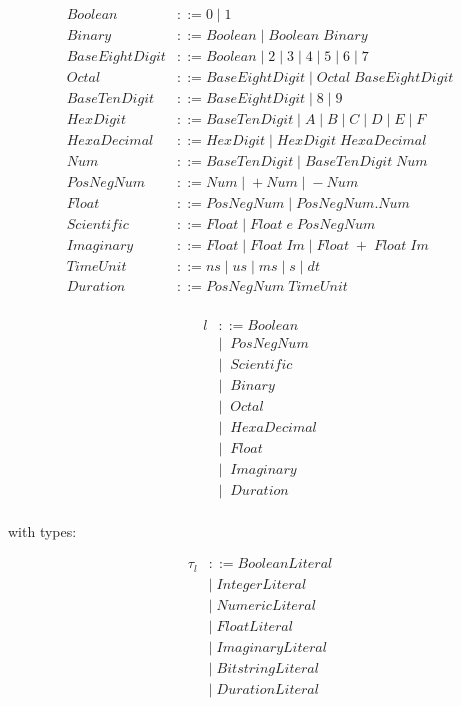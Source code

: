\documentclass{article}
\begin{document}
\begin{align*}
    Boolean &::= 0 \; | \; 1 \\
    Binary &::= Boolean \; | \; Boolean \; Binary \\
    BaseEightDigit &::= Boolean \; | \; 2 \; | \; 3 \; | \; 4 \; | \; 5 \; | \; 6 \; | \; 7 \\
    Octal &::= BaseEightDigit \; | \; Octal \; BaseEightDigit \\
    BaseTenDigit &::= BaseEightDigit \; | \; 8 \; | \; 9 \\
    HexDigit & ::= BaseTenDigit \; | \; A \; | \; B \; | \; C \; | \; D \; | \; E \; | \; F \\
    HexaDecimal &::= HexDigit \; | \; HexDigit \; HexaDecimal \\
    Num &::= BaseTenDigit \; | \; BaseTenDigit \; Num \\
    PosNegNum &::= Num \; | \; +Num \; | \; -Num \\
    Float &::= PosNegNum \; | \; PosNegNum.Num \\
    Scientific &::= Float \; | \; Float \; e \; PosNegNum \\
    Imaginary &::= Float \; | \; Float \; Im \; | \; Float \; + \; Float \; Im \\
    TimeUnit &::= ns \; | \; us \; | \; ms \; | \; s \; | \; dt \\
    Duration &::= PosNegNum \; TimeUnit \\
\end{align*}

\begin{align*}
    l &::= Boolean \\
        &| \;\; PosNegNum \\
        &| \;\;  Scientific \\
        &| \;\;  Binary \\
        &| \;\;  Octal \\
        &| \;\;  HexaDecimal \\
        &| \;\;  Float \\
        &| \;\;  Imaginary \\
        &| \;\;  Duration \\
\end{align*}

with types:

\begin{align*}
    \tau_l &::= BooleanLiteral \\
        &| \; IntegerLiteral \\
        &| \; NumericLiteral \\
        &| \; FloatLiteral \\
        &| \; ImaginaryLiteral \\
        &| \; BitstringLiteral \\
        &| \; DurationLiteral \\
\end{align*}
\end{document}
